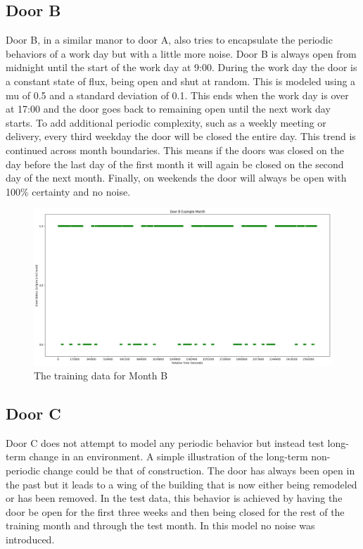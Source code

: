   \subsection{ Door B }

  Door B, in a similar manor to door A, also tries to encapsulate the periodic
  behaviors of a work day but with a little more noise. Door B is always open
  from midnight until the start of the work day at 9:00. During the work day
  the door is a constant state of flux, being open and shut at random. This is
  modeled using a mu of 0.5 and a standard deviation of 0.1. This ends when
  the work day is over at 17:00 and the door goes back to remaining open until
  the next work day starts. To add additional periodic complexity, such as a
  weekly meeting or delivery, every third weekday the door will be closed the
  entire day. This trend is continued across month boundaries. This means if
  the doors was closed on the day before the last day of the first month it
  will again be closed on the second day of the next month. Finally, on
  weekends the door will always be open with 100\% certainty and no noise. \\

  \begin{figure}[!htb]
    \centering
    \includegraphics[width=\linewidth]{images/Door_B_Example_Month.png}
    \caption{The training data for Month B}
    \label{figure:Door B Training Month}
  \end{figure}

  \subsection{ Door C }

  Door C does not attempt to model any periodic behavior but instead test
  long-term change in an environment. A simple illustration of the long-term
  non-periodic change could be that of construction. The door has always been
  open in the past but it leads to a wing of the building that is now either
  being remodeled or has been removed. In the test data, this behavior is
  achieved by having the door be open for the first three weeks and then being
  closed for the rest of the training month and through the test month. In
  this model no noise was introduced. \\

